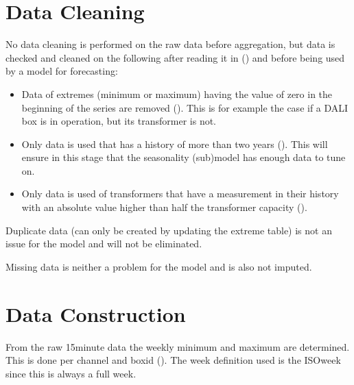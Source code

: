 \documentclass[letterpaper,10pt,english]{sphinxmanual}
\begin{document}
\section{Data Cleaning}
\label{\detokenize{data_preparation:data-cleaning}}
No data cleaning is performed on the raw data before aggregation, but data is checked and cleaned on the following after reading it in ({\hyperref[\detokenize{autoapi/src/preprocess/preprocess/index:src.preprocess.preprocess.load_data}]{}}) and before being used by a model for forecasting:
\begin{itemize}
\item {} 
Data of extremes (minimum or maximum) having the value of zero in the beginning of the series are removed ({\hyperref[\detokenize{autoapi/src/preprocess/preprocess/index:src.preprocess.preprocess.remove_leading_idling}]{}}). This is for example the case if a DALI box is in operation, but its transformer is not.

\item {} 
Only data is used that has a history of more than two years ({\hyperref[\detokenize{autoapi/src/preprocess/preprocess/index:src.preprocess.preprocess.too_short}]{}}). This will ensure in this stage that the seasonality (sub)model has enough data to tune on.

\item {} 
Only data is used of transformers that have a measurement in their history with an absolute value higher than half the transformer capacity ({\hyperref[\detokenize{autoapi/src/preprocess/preprocess/index:src.preprocess.preprocess.too_small}]{}}).

\end{itemize}

Duplicate data (can only be created by updating the extreme table) is not an issue for the model and will not be eliminated.

Missing data is neither a problem for the model and is also not imputed.


\section{Data Construction}
\label{\detokenize{data_preparation:data-construction}}
From the raw 15\sphinxhyphen{}minute data the weekly minimum and maximum are determined. This is done per channel and boxid ({\hyperref[\detokenize{autoapi/src/utils/snowflake/index:src.utils.snowflake.make_week_extremes_query}]{}}).
The week definition used is the ISO\sphinxhyphen{}week since this is always a full week.
\end{document}
